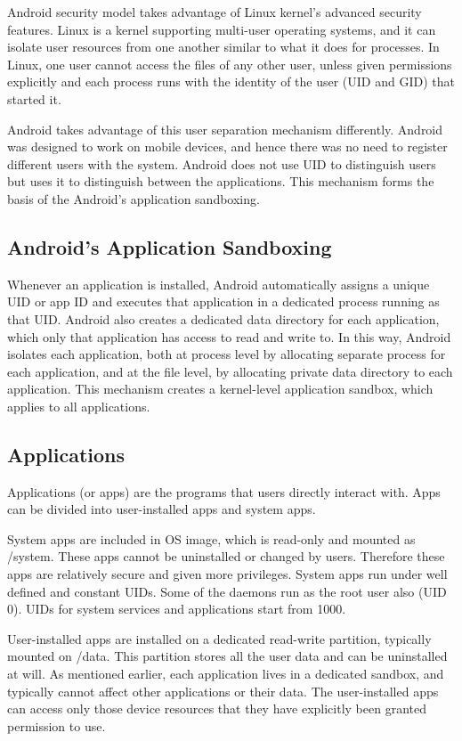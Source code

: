 Android security model takes advantage of Linux kernel's advanced security features. Linux is a kernel supporting multi-user operating systems, and it can isolate user resources from one another similar to what it does for processes. In Linux, one user cannot access the files of any other user, unless given permissions explicitly and each process runs with the identity of the user (UID and GID) that started it.


Android takes advantage of this user separation mechanism differently. Android was designed to work on mobile devices, and hence there was no need to register different users with the system. Android does not use UID to distinguish users but uses it to distinguish between the applications. This mechanism forms the basis of the Android's application sandboxing. 


\subsection{Android's Application Sandboxing}
Whenever an application is installed, Android automatically assigns a unique UID or app ID and executes that application in a dedicated process running as that UID. Android also creates a dedicated data directory for each application, which only that application has access to read and write to. In this way, Android isolates each application, both at process level by allocating separate process for each application, and at the file level, by allocating private data directory to each application. This mechanism creates a kernel-level application sandbox, which applies to all applications. 

\subsection{Applications}
Applications (or apps) are the programs that users directly interact with. Apps can be divided into user-installed apps and system apps. 

System apps are included in OS image, which is read-only and mounted as /system. These apps cannot be uninstalled or changed by users. Therefore these apps are relatively secure and given more privileges. System apps run under well defined and constant UIDs. Some of the daemons run as the root user also (UID 0). UIDs for system services and applications start from 1000.

User-installed apps are installed on a dedicated read-write partition, typically mounted on /data. This partition stores all the user data and can be uninstalled at will. As mentioned earlier, each application lives in a dedicated sandbox, and typically cannot affect other applications or their data. The user-installed apps can access only those device resources that they have explicitly been granted permission to use. 

